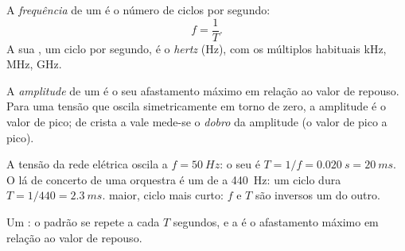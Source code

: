 \begin{definition}[Frequência]\label{def:g10:signals-and-waves:frequency}
A \emph{frequência} de um  é o número de
ciclos por segundo:
\[
f = \frac{1}{T} .
\]
A sua , um ciclo por segundo, é o \emph{hertz}
(\unit{Hz}), com os múltiplos habituais \unit{kHz}, \unit{MHz},
\unit{GHz}.
\end{definition}

\begin{definition}[Amplitude]\label{def:g10:signals-and-waves:amplitude}
A \emph{amplitude} de um  é o seu
afastamento máximo em relação ao valor de repouso. Para uma tensão que
oscila simetricamente em torno de zero, a amplitude é o valor de pico; de
crista a vale mede-se o \emph{dobro} da amplitude (o valor de pico a
pico).
\end{definition}

\begin{example}\label{ex:g10:signals-and-waves:mains}
A tensão da rede elétrica oscila a $f = \qty{50}{Hz}$: o seu  é
$T = 1/f = \qty{0.020}{s} = \qty{20}{ms}$. O lá de concerto de uma
orquestra é um  de  a \qty{440}{Hz}: um ciclo dura
$T = 1/440 = \qty{2.3}{ms}$.  maior, ciclo mais curto: $f$ e
$T$ são inversos um do outro.
\end{example}

\begin{omfigure}

{\small Um : o padrão se repete a cada $T$ segundos, e a
 é o afastamento máximo em relação ao valor de repouso.}
\end{omfigure}

